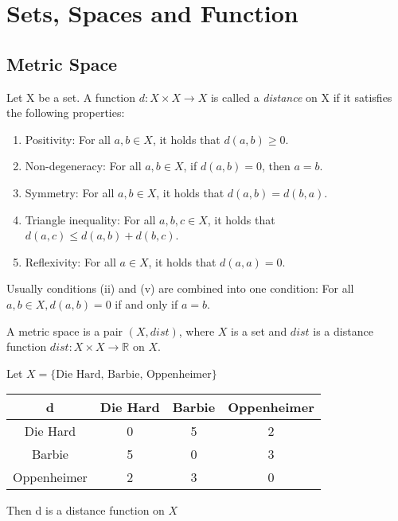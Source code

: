 \section{Sets, Spaces and Function}

\subsection{Metric Space}

\begin{definition}[distance]
    Let X be a set. A function $d: X \times X \to X$ is called a
    \emph{distance} on X if it satisfies the following properties:
    \begin{enumerate}[label=(\roman*)]
        \item Positivity: For all $a,b \in X$, it holds that $d(a,b) \ge 0$.
        \item Non-degeneracy: For all $a,b \in X$, if $d(a,b) = 0$, then $a = b$.
        \item Symmetry: For all $a,b \in X$, it holds that $d(a,b) = d(b,a)$.
        \item Triangle inequality: For all $a,b,c \in X$, it holds that $d(a,c) \le d(a,b) + d(b,c)$.
        \item Reflexivity: For all $a \in X$, it holds that $d(a,a) = 0$.
    \end{enumerate}
\end{definition}

Usually conditions (ii) and (v) are combined into one condition: For all $a,b
\in X, d(a,b) = 0$ if and only if $a = b$.


\begin{definition}
    A metric space is a pair $(X,dist)$, where $X$ is a set and $dist$ is a
    distance function $dist: X \times X \to \mathbb{R}$ on $X$.
\end{definition}

\begin{example}
    Let $ X = \{\text{Die Hard, Barbie, Oppenheimer} \}$

    \begin{table}[h]
        \centering
        \begin{tabular}{c|c|c|c|}
            \cline{2-4}
            d & Die Hard & Barbie & Oppenheimer \\ \hline
            \multicolumn{1}{|c|}{Die Hard}      & 0 & 5 & 2 \\ \hline
            \multicolumn{1}{|c|}{Barbie}        & 5 & 0 & 3 \\ \hline
            \multicolumn{1}{|c|}{Oppenheimer}   & 2 & 3 & 0 \\ \hline
        \end{tabular}
    \end{table}


    Then d is a distance function on $X$
\end{example}

